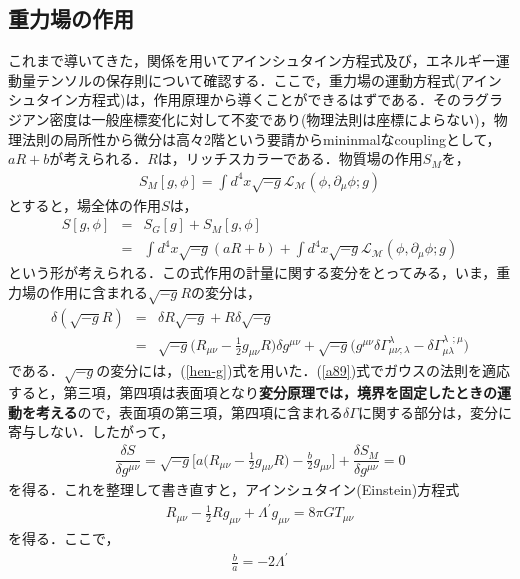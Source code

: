 \subsection{重力場の作用}
これまで導いてきた，関係を用いてアインシュタイン方程式及び，エネルギー運動量テンソルの保存則について確認する．ここで，重力場の運動方程式(アインシュタイン方程式)は，作用原理から導くことができるはずである．そのラグラジアン密度は一般座標変化に対して不変であり(物理法則は座標によらない)，物理法則の局所性から微分は高々2階という要請からmininmalなcouplingとして，$aR+b$が考えられる．$R$は，リッチスカラーである．物質場の作用$S_{M}$を，
\begin{eqnarray}
\label{a82}
S_{M}[g,\phi]=\int d^4x\sqrt{-g}\mathcal{L_{M}}(\phi,\partial_{\mu}\phi;g)
\end{eqnarray}
とすると，場全体の作用$S$は，
\begin{eqnarray}
S[g,\phi]&=&S_{G}[g]+S_{M}[g,\phi] \nonumber \\
&=&\int d^4x\sqrt{-g}(aR+b)+\int d^4x\sqrt{-g}\mathcal{L_{M}}(\phi,\partial_{\mu}\phi;g)
\end{eqnarray}
という形が考えられる．この式作用の計量に関する変分をとってみる，いま，重力場の作用に含まれる$\sqrt{-g}R$の変分は，
\begin{eqnarray}
\label{a89}
\delta(\sqrt{-g}R)&=&\delta R\sqrt{-g}+R\delta\sqrt{-g} \nonumber \\
&=&\sqrt{-g}\biggl(R_{\mu\nu}-\frac{1}{2}g_{\mu\nu}R\biggr)\delta g^{\mu\nu}+\sqrt{-g}\biggl(g^{\mu\nu}\delta\Gamma^{\lambda}_{\mu\nu;\lambda}-\delta\Gamma^{\lambda \ \ ;\mu}_{\mu\lambda}\biggr)
\end{eqnarray}
である．$\sqrt{-g}$の変分には，(\ref{hen-g})式を用いた．(\ref{a89})式でガウスの法則を適応すると，第三項，第四項は表面項となり\textbf{変分原理では，境界を固定したときの運動を考える}ので，表面項の第三項，第四項に含まれる$\delta\Gamma$に関する部分は，変分に寄与しない．したがって，
\begin{eqnarray}
\dfrac{\delta S}{\delta g^{\mu\nu}}=\sqrt{-g}\biggl[a\biggl(R_{\mu\nu}-\frac{1}{2}g_{\mu\nu}R\biggr)-\frac{b}{2}g_{\mu\nu}\biggr]+\dfrac{\delta S_{M}}{\delta g^{\mu\nu}}=0
\end{eqnarray}
を得る．これを整理して書き直すと，アインシュタイン(Einstein)方程式
\begin{eqnarray}
R_{\mu\nu}-\frac{1}{2}Rg_{\mu\nu}+\Lambda^{\prime} g_{\mu\nu}=8\pi GT_{\mu\nu}
\end{eqnarray}
を得る．ここで，
\begin{eqnarray}
\frac{b}{a}=-2\Lambda^{\prime}
\end{eqnarray}
